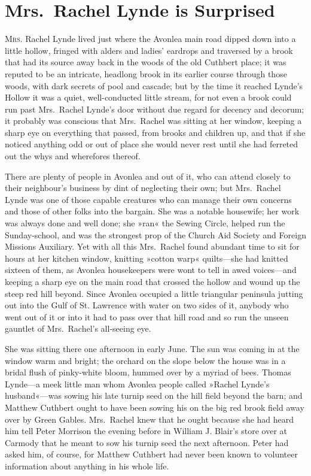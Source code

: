 \chapter{Mrs.~Rachel Lynde is Surprised}

\lettrine[lines=4]{M}{rs}. Rachel Lynde lived just where the Avonlea main road dipped down into a little hollow, fringed with alders and ladies' eardrops and traversed by a brook that had its source away back in the woods of the old Cuthbert place; it was reputed to be an intricate, headlong brook in its earlier course through those woods, with dark secrets of pool and cascade; but by the time it reached Lynde's Hollow it was a quiet, well-conducted little stream, for not even a brook could run past Mrs.~Rachel Lynde's door without due regard for decency and decorum; it probably was conscious that Mrs.~Rachel was sitting at her window, keeping a sharp eye on everything that passed, from brooks and children up, and that if she noticed anything odd or out of place she would never rest until she had ferreted out the whys and wherefores thereof.

There are plenty of people in Avonlea and out of it, who can attend closely to their neighbour's business by dint of neglecting their own; but Mrs.~Rachel Lynde was one of those capable creatures who can manage their own concerns and those of other folks into the bargain. She was a notable housewife; her work was always done and well done; she »ran« the Sewing Circle, helped run the Sunday-school, and was the strongest prop of the Church Aid Society and Foreign Missions Auxiliary. Yet with all this Mrs.~Rachel found abundant time to sit for hours at her kitchen window, knitting »cotton warp« quilts—she had knitted sixteen of them, as Avonlea housekeepers were wont to tell in awed voices—and keeping a sharp eye on the main road that crossed the hollow and wound up the steep red hill beyond. Since Avonlea occupied a little triangular peninsula jutting out into the Gulf of St. Lawrence with water on two sides of it, anybody who went out of it or into it had to pass over that hill road and so run the unseen gauntlet of Mrs.~Rachel's all-seeing eye.

She was sitting there one afternoon in early June. The sun was coming in at the window warm and bright; the orchard on the slope below the house was in a bridal flush of pinky-white bloom, hummed over by a myriad of bees. Thomas Lynde—a meek little man whom Avonlea people called »Rachel Lynde's husband«—was sowing his late turnip seed on the hill field beyond the barn; and Matthew Cuthbert ought to have been sowing his on the big red brook field away over by Green Gables. Mrs.~Rachel knew that he ought because she had heard him tell Peter Morrison the evening before in William J. Blair's store over at Carmody that he meant to sow his turnip seed the next afternoon. Peter had asked him, of course, for Matthew Cuthbert had never been known to volunteer information about anything in his whole life.

